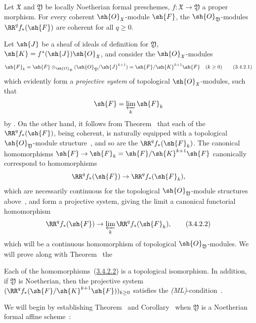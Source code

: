 \begin{theorem}[3.4.2]
\label{III.3.4.2}
Let $\mathfrak{X}$ and $\mathfrak{Y}$ be locally Noetherian formal preschemes, $f:\mathfrak{X}\to\mathfrak{Y}$ a proper morphism.
For every coherent $\sh{O}_\mathfrak{X}$-module $\sh{F}$, the $\sh{O}_\mathfrak{Y}$-modules $\RR^q f_*(\sh{F})$ are coherent for all $q\geq 0$.
\end{theorem}

Let $\sh{J}$ be a sheaf of ideals of definition for $\mathfrak{Y}$, $\sh{K}=f^*(\sh{J})\sh{O}_\mathfrak{X}$, and consider the $\sh{O}_\mathfrak{X}$-modules
\[
\label{III.3.4.2.1}
  \sh{F}_k=\sh{F}\otimes_{\sh{O}_\mathfrak{Y}}(\sh{O}_\mathfrak{Y}/\sh{J}^{k+1})=\sh{F}/\sh{K}^{k+1}\sh{F}\quad(k\geq 0)
  \tag{3.4.2.1}
\]
which evidently form a \emph{projective system} of topological $\sh{O}_\mathfrak{X}$-modules, such that
\[
  \sh{F}=\varprojlim_k\sh{F}_k
\]
by .
On the other hand, it follows from Theorem~ that each of the $\RR^q f_*(\sh{F})$, being coherent, is naturally equipped with a topological $\sh{O}_\mathfrak{Y}$-module structure~, and so are the $\RR^q f_*(\sh{F}_k)$.
The canonical homomorphisms $\sh{F}\to\sh{F}_k=\sh{F}/\sh{K}^{k+1}\sh{F}$ canonically correspond to homomorphisms
\[
  \RR^q f_*(\sh{F})\to\RR^q f_*(\sh{F}_k),
\]
which are necessarily continuous for the topological $\sh{O}_\mathfrak{Y}$-module structures above~, and form a projective system, giving the limit a canonical functorial homomorphism
\[
\label{III.3.4.2.2}
  \RR^q f_*(\sh{F})\to\varprojlim_k\RR^q f_*(\sh{F}_k),
  \tag{3.4.2.2}
\]
which will be a continuous homomorphism of topological $\sh{O}_\mathfrak{Y}$-modules.
We will prove along with Theorem~ the
\begin{corollary}[3.4.3]
\label{III.3.4.3}
Each of the homomorphisms~(\hyperref[III.3.4.2.2]{3.4.2.2}) is a topological isomorphism.
In addition, if $\mathfrak{Y}$ is Noetherian, then the projective system $(\RR^q f_*(\sh{F}/\sh{K}^{k+1}\sh{F}))_{k\geq 0}$ satisfies the \emph{(ML)}-condition~.
\end{corollary}
We will begin by establishing Theorem~ and Corollary~ when $\mathfrak{Y}$ is a Noetherian formal affine scheme~:
